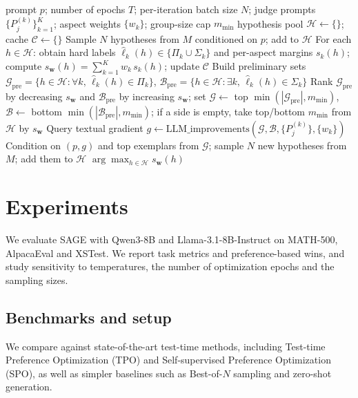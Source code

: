 \documentclass[letterpaper]{article} %
\newcommand{\method}{SAGE}
\newcommand{\batchN}{N}
\begin{document}
\begin{algorithm}[t]
\caption{\method{}: Self-judged iterative response refinement over \(T\) epochs}
\label{alg:method}
\begin{algorithmic}
    prompt \(p\); number of epochs \(T\); per-iteration batch size \(\batchN\); judge prompts \(\{P^{(k)}_j\}_{k=1}^K\); aspect weights \(\{w_k\}\); group-size cap \(m_{\min}\)
    hypothesis pool \(\mathcal{H} \leftarrow \{\}\); cache \(\mathcal{C}\leftarrow \{\}\)
    Sample \(\batchN\) hypotheses from \(M\) conditioned on \(p\); add to \(\mathcal{H}\)
     \STATE For each \(h\in\mathcal{H}\): obtain hard labels \(\hat\ell_k(h)\in\{\Pi_k\cup\Sigma_k\}\) and per-aspect margins \(s_k(h)\); compute \(s_{\mathbf{w}}(h)=\sum_{k=1}^K w_k\, s_k(h)\); update \(\mathcal{C}\)
     \STATE Build preliminary sets \(\mathcal{G}_{\text{pre}}=\{h\in\mathcal{H}: \forall k,\, \hat\ell_k(h)\in \Pi_k\}\), \(\mathcal{B}_{\text{pre}}=\{h\in\mathcal{H}: \exists k,\, \hat\ell_k(h)\in \Sigma_k\}\)
     \STATE Rank \(\mathcal{G}_{\text{pre}}\) by decreasing \(s_{\mathbf{w}}\) and \(\mathcal{B}_{\text{pre}}\) by increasing \(s_{\mathbf{w}}\); set \(\mathcal{G}\leftarrow\) top \(\min(|\mathcal{G}_{\text{pre}}|,m_{\min})\), \(\mathcal{B}\leftarrow\) bottom \(\min(|\mathcal{B}_{\text{pre}}|,m_{\min})\); if a side is empty, take top/bottom \(m_{\min}\) from \(\mathcal{H}\) by \(s_{\mathbf{w}}\)
     \STATE Query textual gradient \(g \leftarrow \text{LLM\_improvements}(\mathcal{G}, \mathcal{B}, \{P^{\!(k)}_j\}, \{w_k\})\)
     \STATE Condition on \((p, g)\) and top exemplars from \(\mathcal{G}\); sample \(\batchN\) new hypotheses from \(M\); add them to \(\mathcal{H}\)
   \ENDFOR
    \(\arg\max_{h\in\mathcal{H}} s_{\mathbf{w}}(h)\)
\end{algorithmic}
\end{algorithm}

\section{Experiments}
\label{sec:experiments}
We evaluate \method{} with Qwen3-8B \citep{yang2025qwen3} and Llama-3.1-8B-Instruct \citep{grattafiori2024llama} on MATH-500, AlpacaEval and XSTest. We report task metrics and preference-based wins, and study sensitivity to temperatures, the number of optimization epochs and the sampling sizes.

\subsection{Benchmarks and setup}
We compare against state-of-the-art test-time methods, including Test-time Preference Optimization (TPO) and Self-supervised Preference Optimization (SPO), as well as simpler baselines such as Best-of-\(N\) sampling and zero-shot generation.
\end{document}
